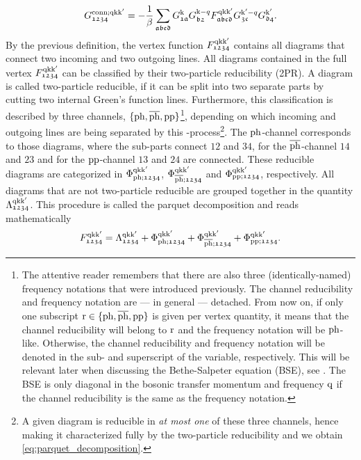 \documentclass[../../main.tex]{subfiles}
\begin{document}
\begin{align}
	G_{\mathfrak{1234}}^{\text{conn};\text{q}\text{k}\text{k}'} = -\frac1\beta \sum_{\mathfrak{abcd}} G_{\mathfrak{1a}}^{\text{k}} G_{\mathfrak{b2}}^{\text{k}-q} F_{\mathfrak{abcd}}^{\text{q}\text{k}\text{k}'} G_{\mathfrak{3c}}^{\text{k}'-q} G_{\mathfrak{d4}}^{\text{k}'}.
\end{align}
By the previous definition, the vertex function $F_{\mathfrak{1234}}^{\text{q}\text{k}\text{k}'}$ contains all diagrams that connect two incoming and two outgoing lines. All diagrams contained in the full vertex $F_{\mathfrak{1234}}^{\text{q}\text{k}\text{k}'}$ can be classified by their two-particle reducibility (2PR). A diagram is called two-particle reducible, if it can be split into two separate parts by cutting two internal Green's function lines. Furthermore, this classification is described by three channels, $\{\text{ph},\overline{\text{ph}},\text{pp}\}$\footnote{The attentive reader remembers that there are also three (identically-named) frequency notations that were introduced previously. The channel reducibility and frequency notation are --- in general --- detached. From now on, if only one subscript $\text{r}\in\{\text{ph},\overline{\text{ph}},\text{pp}\}$ is given per vertex quantity, it means that the channel reducibility will belong to $\text{r}$ and the frequency notation will be $\text{ph}$-like. Otherwise, the channel reducibility and frequency notation will be denoted in the sub- and superscript of the variable, respectively. This will be relevant later when discussing the Bethe-Salpeter equation (BSE), see . The BSE is only diagonal in the bosonic transfer momentum and frequency $\text{q}$ if the channel reducibility is the same as the frequency notation.}, depending on which incoming and outgoing lines are being separated by this -process\footnote{A given diagram is reducible in \textit{at most one} of these three channels, hence making it characterized fully by the two-particle reducibility and we obtain \eqref{eq:parquet_decomposition}.}. The $\text{ph}$-channel corresponds to those diagrams, where the sub-parts connect $\mathfrak{12}$ and $\mathfrak{34}$, for the $\overline{\text{ph}}$-channel $\mathfrak{14}$ and $\mathfrak{23}$ and for the $\text{pp}$-channel $\mathfrak{13}$ and $\mathfrak{24}$ are connected. These reducible diagrams are categorized in $\Phi_{\text{ph};\mathfrak{1234}}^{\text{q}\text{k}\text{k}'}$, $\Phi_{\overline{\text{ph}};\mathfrak{1234}}^{\text{q}\text{k}\text{k}'}$ and $\Phi_{\text{pp};\mathfrak{1234}}^{\text{q}\text{k}\text{k}'}$, respectively. All diagrams that are not two-particle reducible are grouped together in the quantity $\Lambda_{\mathfrak{1234}}^{\text{q}\text{k}\text{k}'}$. This procedure is called the parquet decomposition and reads mathematically
\begin{align}\label{eq:parquet_decomposition}
	F_{\mathfrak{1234}}^{\text{q}\text{k}\text{k}'}=\Lambda_{\mathfrak{1234}}^{\text{q}\text{k}\text{k}'}+\Phi_{\text{ph};\mathfrak{1234}}^{\text{q}\text{k}\text{k}'}+\Phi_{\overline{\text{ph}};\mathfrak{1234}}^{\text{q}\text{k}\text{k}'}+\Phi_{\text{pp};\mathfrak{1234}}^{\text{q}\text{k}\text{k}'}.
\end{align}
\end{document}
